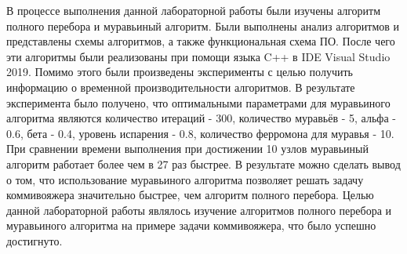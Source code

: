 \Conclusion
В процессе выполнения данной лабораторной работы были изучены алгоритм полного перебора и муравьиный алгоритм. Были выполнены анализ алгоритмов и представлены схемы алгоритмов, а также функциональная схема ПО. После чего эти алгоритмы были реализованы при помощи языка C++ в IDE Visual Studio 2019. Помимо этого были произведены эксперименты с целью получить информацию о временной производительности алгоритмов. В результате эксперимента было получено, что оптимальными параметрами для муравьиного алгоритма являются количество итераций - 300, количество муравьёв - 5, альфа - 0.6, бета - 0.4, уровень испарения - 0.8, количество ферромона для муравья - 10. При сравнении времени выполнения при достижении 10 узлов муравьиный алгоритм работает более чем в 27 раз быстрее. В результате можно сделать вывод о том, что использование муравьиного алгоритма позволяет решать задачу коммивояжера значительно быстрее, чем алгоритм полного перебора. Целью данной лабораторной работы являлось изучение алгоритмов полного перебора и муравьиного алгоритма на примере задачи коммивояжера, что было успешно достигнуто.
